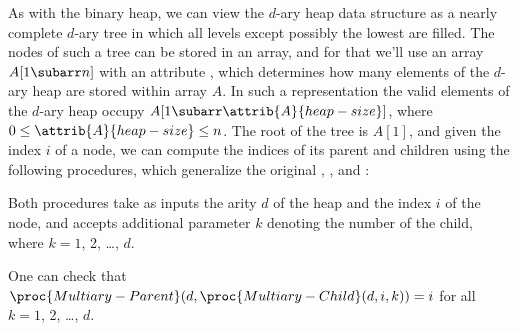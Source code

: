 As with the binary heap, we can view the $d$-ary heap data structure as a nearly complete $d$-ary tree in which all levels except possibly the lowest are filled.
The nodes of such a tree can be stored in an array, and for that we'll use an array $A[1\subarr n]$ with an attribute , which determines how many elements of the $d$-ary heap are stored within array $A$.
In such a representation the valid elements of the $d$-ary heap occupy $A[1\subarr\attrib{A}{heap-size}]$, where $0\le\attrib{A}{heap-size}\le n$.
The root of the tree is $A[1]$, and given the index $i$ of a node, we can compute the indices of its parent and children using the following procedures, which generalize the original , , and :


Both procedures take as inputs the arity $d$ of the heap and the index $i$ of the node, and  accepts additional parameter $k$ denoting the number of the child, where $k=1$, 2, \dots, $d$.

One can check that $\proc{Multiary-Parent}(d,\proc{Multiary-Child}(d,i,k))=i$ for all $k=1$, 2, \dots, $d$.
